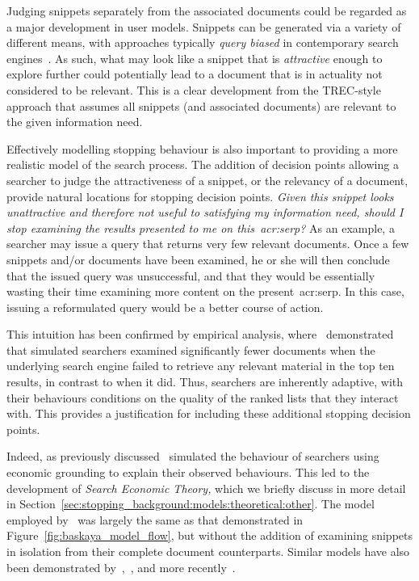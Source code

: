 Judging snippets separately from the associated documents could be regarded as a major development in user models. Snippets can be generated via a variety of different means, with approaches typically \emph{query biased} in contemporary search engines~\citep{tombros1998query_biased}. As such, what may look like a snippet that is \emph{attractive} enough to explore further could potentially lead to a document that is in actuality not considered to be relevant. This is a clear development from the TREC-style approach that assumes all snippets (and associated documents) are relevant to the given information need.

Effectively modelling stopping behaviour is also important to providing a more realistic model of the search process. The addition of decision points allowing a searcher to judge the attractiveness of a snippet, or the relevancy of a document, provide natural locations for stopping decision points. \emph{Given this snippet looks unattractive and therefore not useful to satisfying my information need, should I stop examining the results presented to me on this~\gls{acr:serp}?} As an example, a searcher may issue a query that returns very few relevant documents. Once a few snippets and/or documents have been examined, he or she will then conclude that the issued query was unsuccessful, and that they would be essentially wasting their time examining more content on the present~\gls{acr:serp}. In this case, issuing a reformulated query would be a better course of action.

This intuition has been confirmed by empirical analysis, where~\cite{azzopardi2011economics} demonstrated that simulated searchers examined significantly fewer documents when the underlying search engine failed to retrieve any relevant material in the top ten results, in contrast to when it did. Thus, searchers are inherently adaptive, with their behaviours conditions on the quality of the ranked lists that they interact with. This provides a justification for including these additional stopping decision points.

Indeed, as previously discussed~\cite{azzopardi2011economics} simulated the behaviour of searchers using economic grounding to explain their observed behaviours. This led to the development of \emph{Search Economic Theory,} which we briefly discuss in more detail in Section~\ref{sec:stopping_background:models:theoretical:other}. The model employed by~\cite{azzopardi2011economics} was largely the same as that demonstrated in Figure~\ref{fig:baskaya_model_flow}, but without the addition of examining snippets in isolation from their complete document counterparts. Similar models have also been demonstrated by~\cite{yilmaz2010browsing_utility},~\cite{carterette2011models}, and more recently~\cite{zhang2017simulation_model}.

